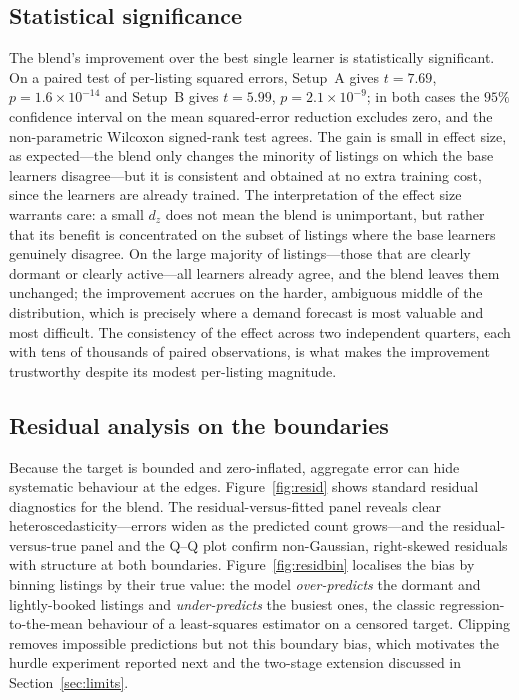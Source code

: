 \documentclass[journal]{IEEEtran}
\begin{document}
\subsection{Statistical significance}
The blend's improvement over the best single learner is statistically significant.
On a paired test of per-listing squared errors, Setup~A gives $t=7.69$,
$p=1.6\times10^{-14}$ and Setup~B gives $t=5.99$, $p=2.1\times10^{-9}$; in both
cases the $95\%$ confidence interval on the mean squared-error reduction excludes
zero, and the non-parametric Wilcoxon signed-rank test agrees. The gain is small
in effect size, as expected---the blend only changes the minority of listings on
which the base learners disagree---but it is consistent and obtained at no extra
training cost, since the learners are already trained. The interpretation of the
effect size warrants care: a small $d_z$ does not mean the blend is unimportant,
but rather that its benefit is concentrated on the subset of listings where the
base learners genuinely disagree. On the large majority of listings---those that
are clearly dormant or clearly active---all learners already agree, and the blend
leaves them unchanged; the improvement accrues on the harder, ambiguous middle of
the distribution, which is precisely where a demand forecast is most valuable and
most difficult. The consistency of the effect across two independent quarters, each
with tens of thousands of paired observations, is what makes the improvement
trustworthy despite its modest per-listing magnitude.

\subsection{Residual analysis on the boundaries}
Because the target is bounded and zero-inflated, aggregate error can hide
systematic behaviour at the edges. Figure~\ref{fig:resid} shows standard residual
diagnostics for the blend. The residual-versus-fitted panel reveals clear
heteroscedasticity---errors widen as the predicted count grows---and the
residual-versus-true panel and the Q--Q plot confirm non-Gaussian, right-skewed
residuals with structure at both boundaries. Figure~\ref{fig:residbin} localises
the bias by binning listings by their true value: the model \emph{over-predicts}
the dormant and lightly-booked listings and \emph{under-predicts} the busiest ones,
the classic regression-to-the-mean behaviour of a least-squares estimator on a
censored target. Clipping removes impossible predictions but not this boundary
bias, which motivates the hurdle experiment reported next and the two-stage
extension discussed in Section~\ref{sec:limits}.
\end{document}
